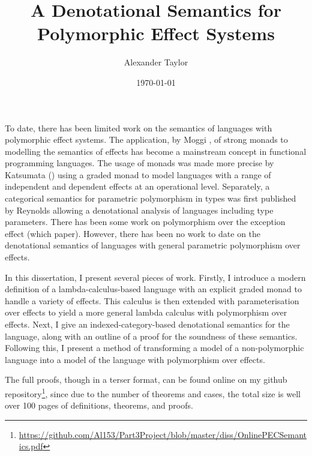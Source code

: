 \documentclass{Report}
\title{A Denotational Semantics for Polymorphic Effect Systems}
\date{\today}
\author{Alexander Taylor}
\begin{document}
\maketitle

\newcommand{\note}[1]{
}

\note{
    Alan
        - base is already used to refer to base category
        - cartesian closed category is correct (weird, I know)
        - Changed definition of S-Category
        - changed "Required Category Structure"

        - Framed all theorems + neatened definitions of theorems, added more references
        - Improved prose-to-maths ratio of substitution+weakening sections.
        - More boxification
        - better? explanation of the effects monoid
}


\abstract
To date, there has been limited work on the semantics of languages with polymorphic effect systems. The application, by Moggi \cite{MoggiMonads}, of strong monads to modelling the semantics of effects has become a mainstream concept in functional programming languages. The usage of monads was made more precise by Katsumata (\cite{Katsumata:2014}) using a graded monad to model languages with a range of independent and dependent effects at an operational level. Separately, a categorical semantics for parametric polymorphism in types was first published by Reynolds \cite{PLCSemantics} allowing a denotational analysis of languages including type parameters. There has been some work on polymorphism over the exception effect (which paper). However, there has been no work to date on the denotational semantics of languages with general parametric polymorphism over effects.

In this dissertation, I present several pieces of work. Firstly, I introduce a modern definition of a lambda-calculus-based language with an explicit graded monad to handle a variety of effects. This calculus is then extended with parameterisation over effects to yield a more general lambda calculus with polymorphism over effects. Next, I give an indexed-category-based denotational semantics for the language, along with an outline of a proof for the soundness of these semantics. Following this, I present a method of transforming a model of a non-polymorphic language into a model of the language with polymorphism over effects.

The full proofs, though in a terser format, can be found online on my github repository\footnote{\url{https://github.com/Al153/Part3Project/blob/master/diss/OnlinePECSemantics.pdf}}, since due to the number of theorems and cases, the total size is well over 100 pages of definitions, theorems, and proofs.
\end{document}

